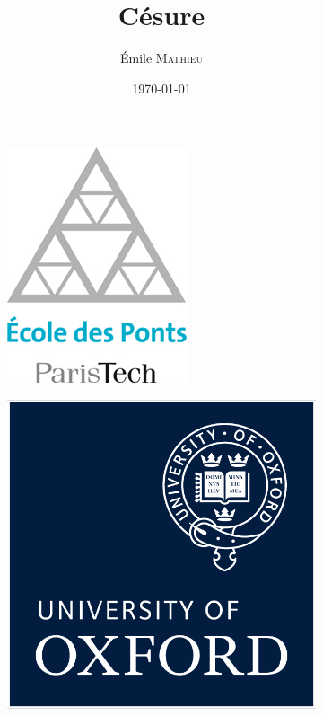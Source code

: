 \documentclass[twoside,10pt,openany,a4paper]{rapport}
\begin{document}
\title{Césure}
\author{Émile \textsc{Mathieu}}
\date{\today}

\frontmatter

\begin{titlepage}
      \begin{center}
      \begin{figure}
\centering
\begin{subfigure}{.5\textwidth}
  \centering
  \includegraphics[width=.6\linewidth]{logo_enpc.jpg}
\end{subfigure}%
\begin{subfigure}{.5\textwidth}
  \centering
  \includegraphics[width=.6\linewidth]{logo_oxford.png}
\end{subfigure}
\vspace{1.0cm}
\end{figure}


\end{center}
\end{titlepage}
\end{document}
